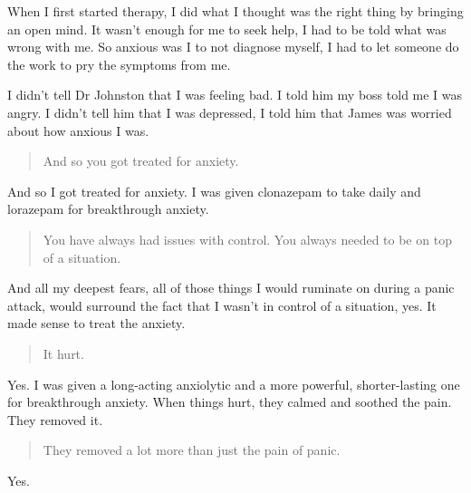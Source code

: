 When I first started therapy, I did what I thought was the right thing by bringing an open mind. It wasn't enough for me to seek help, I had to be told what was wrong with me. So anxious was I to not diagnose myself, I had to let someone do the work to pry the symptoms from me.

I didn't tell Dr Johnston that I was feeling bad. I told him my boss told me I was angry. I didn't tell him that I was depressed, I told him that James was worried about how anxious I was.

\begin{quote}
And so you got treated for anxiety.
\end{quote}

And so I got treated for anxiety. I was given clonazepam to take daily and lorazepam for breakthrough anxiety.

\begin{quote}
You have always had issues with control. You always needed to be on top of a situation.
\end{quote}

And all my deepest fears, all of those things I would ruminate on during a panic attack, would surround the fact that I wasn't in control of a situation, yes. It made sense to treat the anxiety.

\begin{quote}
It hurt.
\end{quote}

Yes. I was given a long-acting anxiolytic and a more powerful, shorter-lasting one for breakthrough anxiety. When things hurt, they calmed and soothed the pain. They removed it.

\begin{quote}
They removed a lot more than just the pain of panic.
\end{quote}

Yes.
